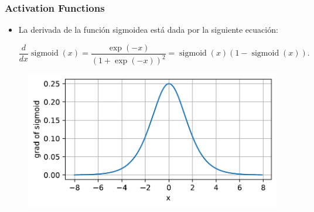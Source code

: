 \documentclass[
  shownotes,
  xcolor={svgnames},
  hyperref={colorlinks,citecolor=DarkBlue,linkcolor=DarkRed,urlcolor=DarkBlue}
  , aspectratio=169]{beamer}
\begin{document}
\begin{frame}
\frametitle{Activation Functions}

\begin{itemize}
\item La derivada de la función sigmoidea está dada por la siguiente ecuación:

$$\frac{d}{dx} \operatorname{sigmoid}(x) = \frac{\exp(-x)}{(1 + \exp(-x))^2} = \operatorname{sigmoid}(x)\left(1-\operatorname{sigmoid}(x)\right).$$

\end{itemize}




  \begin{figure}[H] \centering
            \captionsetup{justification=centering}
              \includegraphics[scale=0.45]{figures/sigmoid_dev}
              
 \end{figure}

\end{frame}
\end{document}

